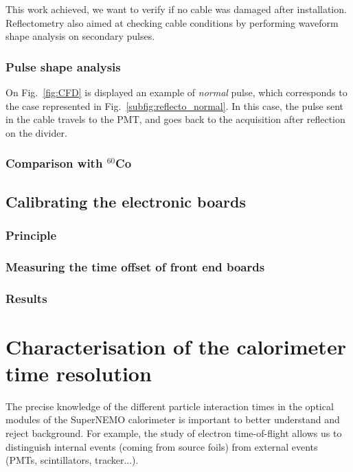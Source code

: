 This work achieved, we want to verify if no cable was damaged after installation.
Reflectometry also aimed at checking cable conditions by performing waveform shape analysis on secondary pulses.

\subsection{Pulse shape analysis}
\label{subsec:pulse_shape}
On Fig.~\ref{fig:CFD} is displayed an example of \emph{normal} pulse, which corresponds to the case represented in Fig.~\ref{subfig:reflecto_normal}.
In this case, the pulse sent in the cable travels to the PMT, and goes back to the acquisition after reflection on the divider.


\subsection{Comparison with $^{60}$Co}



\section{Calibrating the electronic boards}
\label{sec:TimeSynchroFEB}

\subsection{Principle}
\subsection{Measuring the time offset of front end boards}
\subsection{Results}







\chapter{Characterisation of the calorimeter time resolution}

The precise knowledge of the different particle interaction times in the optical modules of the SuperNEMO calorimeter is important to better understand and reject background.
For example, the study of electron time-of-flight allows us to distinguish internal events (coming from source foils) from external events (PMTs, scintillators, tracker...).
\newline


